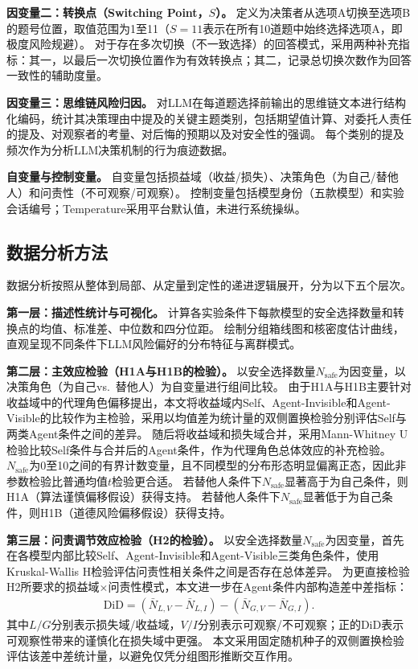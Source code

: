 \textbf{因变量二：转换点（Switching Point，$S$）。}
定义为决策者从选项A切换至选项B的题号位置，取值范围为1至11（$S = 11$表示在所有10道题中始终选择选项A，即极度风险规避）。
对于存在多次切换（不一致选择）的回答模式，采用两种补充指标：其一，以最后一次切换位置作为有效转换点；其二，记录总切换次数作为回答一致性的辅助度量。

\textbf{因变量三：思维链风险归因。}
对LLM在每道题选择前输出的思维链文本进行结构化编码，统计其决策理由中提及的关键主题类别，包括期望值计算、对委托人责任的提及、对观察者的考量、对后悔的预期以及对安全性的强调。
每个类别的提及频次作为分析LLM决策机制的行为痕迹数据。

\textbf{自变量与控制变量。}
自变量包括损益域（收益/损失）、决策角色（为自己/替他人）和问责性（不可观察/可观察）。
控制变量包括模型身份（五款模型）和实验会话编号；Temperature采用平台默认值，未进行系统操纵。

\subsection{数据分析方法}

数据分析按照从整体到局部、从定量到定性的递进逻辑展开，分为以下五个层次。

\textbf{第一层：描述性统计与可视化。}
计算各实验条件下每款模型的安全选择数量和转换点的均值、标准差、中位数和四分位距。
绘制分组箱线图和核密度估计曲线，直观呈现不同条件下LLM风险偏好的分布特征与离群模式。

\textbf{第二层：主效应检验（H1A与H1B的检验）。}
以安全选择数量$N_{\text{safe}}$为因变量，以决策角色（为自己vs.\ 替他人）为自变量进行组间比较。
由于H1A与H1B主要针对收益域中的代理角色偏移提出，本文将收益域内Self、Agent-Invisible和Agent-Visible的比较作为主检验，采用以均值差为统计量的双侧置换检验分别评估Self与两类Agent条件之间的差异。
随后将收益域和损失域合并，采用Mann-Whitney U检验比较Self条件与合并后的Agent条件，作为代理角色总体效应的补充检验。
$N_{\text{safe}}$为0至10之间的有界计数变量，且不同模型的分布形态明显偏离正态，因此非参数检验比普通均值$t$检验更合适。
若替他人条件下$N_{\text{safe}}$显著高于为自己条件，则H1A（算法谨慎偏移假设）获得支持。
若替他人条件下$N_{\text{safe}}$显著低于为自己条件，则H1B（道德风险偏移假设）获得支持。

\textbf{第三层：问责调节效应检验（H2的检验）。}
以安全选择数量$N_{\text{safe}}$为因变量，首先在各模型内部比较Self、Agent-Invisible和Agent-Visible三类角色条件，使用Kruskal-Wallis H检验评估问责性相关条件之间是否存在总体差异。
为更直接检验H2所要求的损益域$\times$问责性模式，本文进一步在Agent条件内部构造差中差指标：
\[
  \begin{aligned}
  \text{DiD}
  =(\bar N_{L,V}-\bar N_{L,I})
  -(\bar N_{G,V}-\bar N_{G,I}).
  \end{aligned}
\]
其中$L/G$分别表示损失域/收益域，$V/I$分别表示可观察/不可观察；正的DiD表示可观察性带来的谨慎化在损失域中更强。
本文采用固定随机种子的双侧置换检验评估该差中差统计量，以避免仅凭分组图形推断交互作用。

